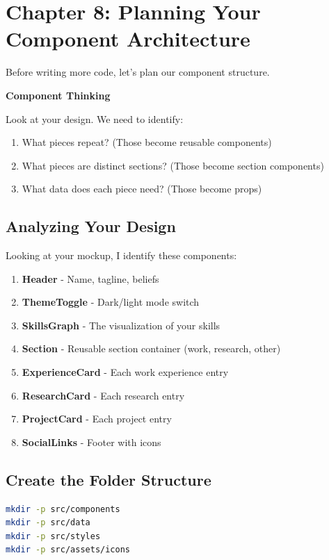 \documentclass[12pt,a4paper]{article}
\begin{document}
\section{Chapter 8: Planning Your Component Architecture}

Before writing more code, let's plan our component structure.

\begin{concept}
\textbf{Component Thinking}

Look at your design. We need to identify:
\begin{enumerate}
    \item What pieces repeat? (Those become reusable components)
    \item What pieces are distinct sections? (Those become section components)
    \item What data does each piece need? (Those become props)
\end{enumerate}
\end{concept}

\subsection{Analyzing Your Design}

Looking at your mockup, I identify these components:

\begin{enumerate}
    \item \textbf{Header} - Name, tagline, beliefs
    \item \textbf{ThemeToggle} - Dark/light mode switch
    \item \textbf{SkillsGraph} - The visualization of your skills
    \item \textbf{Section} - Reusable section container (work, research, other)
    \item \textbf{ExperienceCard} - Each work experience entry
    \item \textbf{ResearchCard} - Each research entry
    \item \textbf{ProjectCard} - Each project entry
    \item \textbf{SocialLinks} - Footer with icons
\end{enumerate}

\subsection{Create the Folder Structure}

\begin{lstlisting}[language=bash,caption={Create component folders}]
mkdir -p src/components
mkdir -p src/data
mkdir -p src/styles
mkdir -p src/assets/icons
\end{lstlisting}
\end{document}
